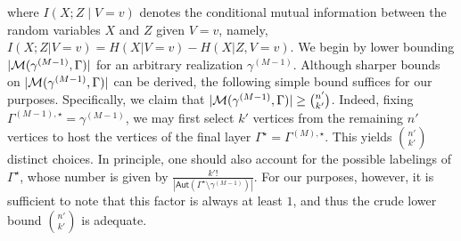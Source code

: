 \documentclass[12pt]{article}
\newcommand{\calM}{{\cal M}}
\newcommand{\s}[1]{\mathsf{#1}}
\begin{document}
where $I(X;Z\mid V=v)$ denotes the conditional mutual information between the random variables $X$ and $Z$ given $V=v$, namely, $I(X;Z\vert V=v) = H(X\vert V=v)-H(X\vert Z,V=v)$. We begin by lower bounding $|\calM(\gamma^{(M-1)},\Gamma)|$ for an arbitrary realization $\gamma^{(M-1)}$. Although sharper bounds on $|\calM(\gamma^{(M-1)},\Gamma)|$ can be derived, the following simple bound suffices for our purposes. Specifically, we claim that $|\calM(\gamma^{(M-1)},\Gamma)| \geq \binom{n'}{k'}$. Indeed, fixing $\Gamma^{(M-1),\star}=\gamma^{(M-1)}$, we may first select $k'$ vertices from the remaining $n'$ vertices to host the vertices of the final layer $\Gamma^\star=\Gamma^{(M),\star}$. This yields $\binom{n'}{k'}$ distinct choices. In principle, one should also account for the possible labelings of $\Gamma^\star$, whose number is given by $\frac{k'!}{|\s{Aut}(\Gamma^\star\setminus\gamma^{(M-1)})|}$. For our purposes, however, it is sufficient to note that this factor is always at least $1$, and thus the crude lower bound $\binom{n'}{k'}$ is adequate.
\end{document}

